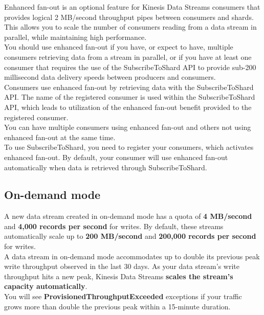 \documentclass[12pt, letterpaper, twoside]{article}
\begin{document}
Enhanced fan-out is an optional feature for Kinesis Data Streams consumers that provides logical 2 MB/second throughput pipes between
consumers and shards. This allows you to scale the number of consumers reading from a data stream in parallel, while maintaining high 
performance.\\

You should use enhanced fan-out if you have, or expect to have, multiple consumers retrieving data from a stream in parallel, or if 
you have at least one consumer that requires the use of the SubscribeToShard API to provide sub-200 millisecond data delivery speeds 
between producers and consumers.\\

Consumers use enhanced fan-out by retrieving data with the SubscribeToShard API. The name of the registered consumer is used within 
the SubscribeToShard API, which leads to utilization of the enhanced fan-out benefit provided to the registered consumer.\\

You can have multiple consumers using enhanced fan-out and others not using enhanced fan-out at the same time.\\

To use SubscribeToShard, you need to register your consumers, which activates enhanced fan-out. By default, your consumer will use 
enhanced fan-out automatically when data is retrieved through SubscribeToShard.\\

\subsection{On-demand mode}
A new data stream created in on-demand mode has a quota of \textbf{4 MB/second} and \textbf{4,000 records per second} for writes. 
By default, these streams automatically scale up to \textbf{200 MB/second} and \textbf{200,000 records per second} for writes.\\

A data stream in on-demand mode accommodates up to double its previous peak write throughput observed in the last 30 days. 
As your data stream’s write throughput hits a new peak, Kinesis Data Streams \textbf{scales the stream’s capacity automatically}.\\
You will see \textbf{ProvisionedThroughputExceeded} exceptions if your traffic grows more than double the previous peak within a 
15-minute duration.\\
\end{document}
